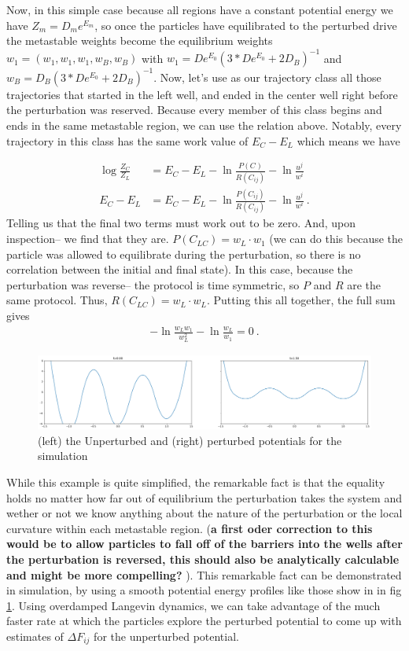 \documentclass[paper=a4, fontsize=10pt]{article} %
\numberwithin{equation}{section} %
\numberwithin{figure}{section} %
\numberwithin{table}{section} %
\def\tbf #1{\textbf{#1} }
\begin{document}
Now, in this simple case because all regions have a constant potential energy we have $Z_m = D_m e^{E_m}$, so once the particles have equilibrated to the perturbed drive the metastable weights become the equilibrium weights $w_1 = ( w_1, w_1, w_1, w_B, w_B)$ with $w_1 = De^{E_0} (3*De^{E_0}+2D_B)^{-1}$ and $w_B = D_B (3*De^{E_0}+2D_B)^{-1}$. Now, let's use as our trajectory class all those trajectories that started in the left well, and ended in the center well right before the perturbation was reserved. Because every member of this class begins and ends in the same metastable region, we can use the relation above. Notably, every trajectory in this class has the same work value of $E_C - E_L$ which means we have

\begin{align}
\log \frac{Z_C}{Z_L} &=  E_C - E_L - \ln \frac{P(C_{})}{R(C_{ij})} - \ln \frac{u^j}{w^i} \\
E_C-E_L &=  E_C - E_L - \ln \frac{P(C_{ij})}{R(C_{ij})} - \ln \frac{u^j}{w^i}
~. 
\end{align}
Telling us that the final two terms must work out to be zero. And, upon inspection-- we find that they are. $P(C_{LC}) = w_L \cdot w_1$ (we can do this because the particle was allowed to equilibrate during the perturbation, so there is no correlation between the initial and final state). In this case, because the perturbation was reverse-- the protocol is time symmetric, so $P$ and $R$ are the same protocol. Thus, $R(C_{LC}) = w_L \cdot w_L$. Putting this all together, the full sum gives
\begin{align}
- \ln \frac{w_L w_1}{w_L^2}  - \ln \frac{w_L}{w_1} = 0
~. 
\end{align}

\begin{figure}
\includegraphics[width=\columnwidth, trim=0 0 0 0, clip]{quad_trip.png}
\centering
\caption{(left) the Unperturbed and (right) perturbed potentials for the simulation}
\label{fig:QuadTrip}
\end{figure}
While this example is quite simplified, the remarkable fact is that the equality holds no matter how far out of equilibrium the perturbation takes the system and wether or not we know anything about the nature of the perturbation or the local curvature within each metastable region. (\tbf{a first oder correction to this would be to allow particles to fall off of the barriers into the wells after the perturbation is reversed, this should also be analytically calculable and might be more compelling?}). This remarkable fact can be demonstrated in simulation, by using a smooth potential energy profiles like those show in in fig \ref{fig:QuadTrip}. Using overdamped Langevin dynamics, we can take advantage of the much faster rate at which the particles explore the perturbed potential to come up with estimates of $\Delta F_{ij}$ for the unperturbed potential.
\end{document}
